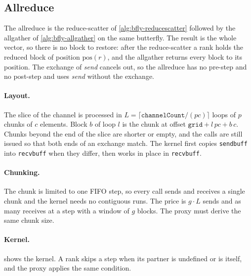 \subsection{Allreduce}\label{sec:bfly-allreduce}

The allreduce is the reduce-scatter of \cref{alg:bfly-reducescatter} followed by the allgather of \cref{alg:bfly-allgather} on the same butterfly.
The result is the whole vector, so there is no block to restore: after the reduce-scatter a rank holds the reduced block of position $\mathrm{pos}(r)$, and the allgather returns every block to its position.
The exchange of \emph{send} cancels out, so the allreduce has no pre-step and no post-step and uses \emph{send} without the exchange.

\paragraph{Layout.}
The slice of the channel is processed in $L=\lceil\texttt{channelCount}/(pc)\rceil$ loops of $p$ chunks of $c$ elements. Block $b$ of loop $l$ is the chunk at offset $\texttt{grid}+l\,pc+b\,c$.
Chunks beyond the end of the slice are shorter or empty, and the calls are still issued so that both ends of an exchange match.
The kernel first copies \texttt{sendbuff} into \texttt{recvbuff} when they differ, then works in place in \texttt{recvbuff}.

\paragraph{Chunking.}
The chunk is limited to one FIFO step, so every call sends and receives a single chunk and the kernel needs no contiguous runs.
The price is $g\cdot L$ sends and as many receives at a step with a window of $g$ blocks.
The proxy must derive the same chunk size.

\paragraph{Kernel.}
 shows the kernel. A rank skips a step when its partner is undefined or is itself, and the proxy applies the same condition.

